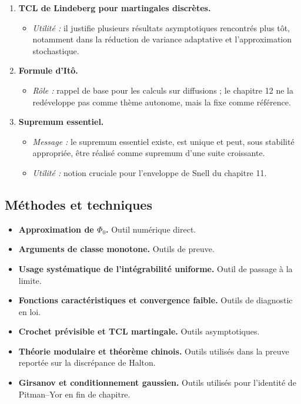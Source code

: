\documentclass[11pt,a4paper]{article}
\begin{document}
\begin{enumerate}[label=\textbf{\arabic*.}]
  \item \textbf{TCL de Lindeberg pour martingales discrètes.}
  \begin{itemize}
    \item \emph{Utilité :} il justifie plusieurs résultats asymptotiques rencontrés plus tôt, notamment dans la réduction de variance adaptative et l'approximation stochastique.
  \end{itemize}

  \item \textbf{Formule d'Itô.}
  \begin{itemize}
    \item \emph{Rôle :} rappel de base pour les calculs sur diffusions ; le chapitre 12 ne la redéveloppe pas comme thème autonome, mais la fixe comme référence.
  \end{itemize}

  \item \textbf{Supremum essentiel.}
  \begin{itemize}
    \item \emph{Message :} le supremum essentiel existe, est unique et peut, sous stabilité appropriée, être réalisé comme supremum d'une suite croissante.
    \item \emph{Utilité :} notion cruciale pour l'enveloppe de Snell du chapitre 11.
  \end{itemize}
\end{enumerate}

\subsection{Méthodes et techniques}

\begin{itemize}
  \item \textbf{Approximation de $\Phi_0$.} Outil numérique direct.
  \item \textbf{Arguments de classe monotone.} Outils de preuve.
  \item \textbf{Usage systématique de l'intégrabilité uniforme.} Outil de passage à la limite.
  \item \textbf{Fonctions caractéristiques et convergence faible.} Outils de diagnostic en loi.
  \item \textbf{Crochet prévisible et TCL martingale.} Outils asymptotiques.
  \item \textbf{Théorie modulaire et théorème chinois.} Outils utilisés dans la preuve reportée sur la discrépance de Halton.
  \item \textbf{Girsanov et conditionnement gaussien.} Outils utilisés pour l'identité de Pitman--Yor en fin de chapitre.
\end{itemize}
\end{document}
